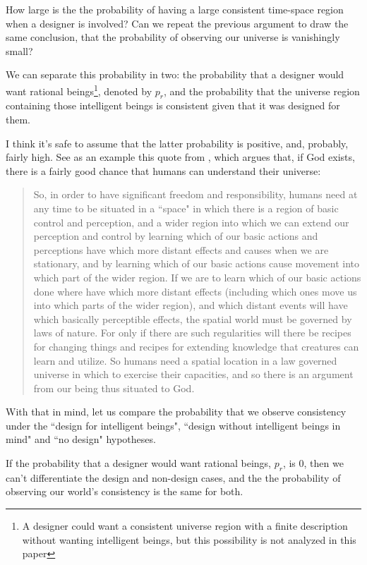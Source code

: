 \documentclass[a4paper
]{article}
\newcommand{\ghilimele}[1]{``#1"}
\begin{document}
How large is the the probability of having
a large consistent time-space region when a designer is involved?
Can we repeat the previous argument to draw the same conclusion, that
the probability of observing our universe is vanishingly small?

We can separate this probability in two: the probability that a designer
would want rational beings\footnote{A designer could want a consistent universe
region with a finite
description without wanting intelligent beings, but this possibility is not
analyzed in this paper}, denoted by $p_r$, and
the probability that the universe region containing
those intelligent beings is consistent
given that it was designed for them.

I think it's safe to assume that the latter probability is positive,
and, probably, fairly high. See as an example this quote from
\textcite{Swinburne2003}, which argues that, if God exists,
there is a fairly good chance that humans can understand their universe:

\begin{quote}
  So, in order to have significant freedom and responsibility, humans need
  at any time to be situated in a \ghilimele{space} in which there is a
  region of basic control and perception, and a wider region into which
  we can extend our perception and control by learning which of our
  basic actions and perceptions have which more distant effects and causes
  when we are stationary, and by learning which of our basic actions cause
  movement into which part of the wider region.
  If we are to learn which of our basic actions done where have which
  more distant effects (including which ones move us into which parts
  of the wider region), and which distant events will have which basically
  perceptible effects, the spatial world must be governed by laws of nature.
  For only if there are such regularities will there be recipes for changing
  things and recipes for extending knowledge that creatures can learn and
  utilize.
  So humans need a spatial location in a law governed universe in which to
  exercise their capacities, and so there is an argument from our being thus
  situated to God.
\end{quote}

With that in mind, let us compare the probability that
we observe consistency under the \ghilimele{design for intelligent beings},
\ghilimele{design without intelligent beings in mind} and
\ghilimele{no design} hypotheses.

If the probability that a
designer would want rational beings, $p_r$, is $0$, then we can't
differentiate the design and non-design cases, and the
the probability of observing our world's consistency is the same
for both.
\end{document}
